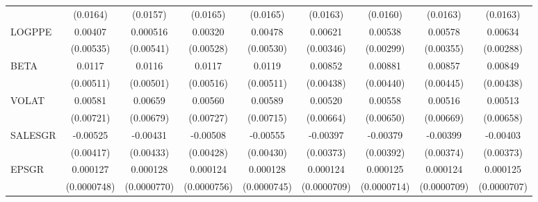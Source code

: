 {\begin{tabular}{l*{8}{c}}
                    &    (0.0164)         &    (0.0157)         &    (0.0165)         &    (0.0165)         &    (0.0163)         &    (0.0160)         &    (0.0163)         &    (0.0163)         \\
LOGPPE              &     0.00407         &    0.000516         &     0.00320         &     0.00478         &     0.00621\sym{*}  &     0.00538\sym{*}  &     0.00578         &     0.00634\sym{**} \\
                    &   (0.00535)         &   (0.00541)         &   (0.00528)         &   (0.00530)         &   (0.00346)         &   (0.00299)         &   (0.00355)         &   (0.00288)         \\
BETA                &      0.0117\sym{**} &      0.0116\sym{**} &      0.0117\sym{**} &      0.0119\sym{**} &     0.00852\sym{*}  &     0.00881\sym{**} &     0.00857\sym{*}  &     0.00849\sym{*}  \\
                    &   (0.00511)         &   (0.00501)         &   (0.00516)         &   (0.00511)         &   (0.00438)         &   (0.00440)         &   (0.00445)         &   (0.00438)         \\
VOLAT               &     0.00581         &     0.00659         &     0.00560         &     0.00589         &     0.00520         &     0.00558         &     0.00516         &     0.00513         \\
                    &   (0.00721)         &   (0.00679)         &   (0.00727)         &   (0.00715)         &   (0.00664)         &   (0.00650)         &   (0.00669)         &   (0.00658)         \\
SALESGR             &    -0.00525         &    -0.00431         &    -0.00508         &    -0.00555         &    -0.00397         &    -0.00379         &    -0.00399         &    -0.00403         \\
                    &   (0.00417)         &   (0.00433)         &   (0.00428)         &   (0.00430)         &   (0.00373)         &   (0.00392)         &   (0.00374)         &   (0.00373)         \\
EPSGR               &    0.000127\sym{*}  &    0.000128         &    0.000124         &    0.000128\sym{*}  &    0.000124\sym{*}  &    0.000125\sym{*}  &    0.000124\sym{*}  &    0.000125\sym{*}  \\
                    & (0.0000748)         & (0.0000770)         & (0.0000756)         & (0.0000745)         & (0.0000709)         & (0.0000714)         & (0.0000709)         & (0.0000707)         \\

\end{tabular}}
